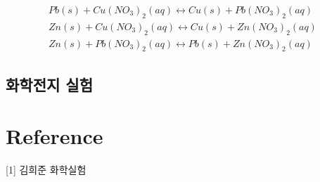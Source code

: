 \documentclass[%
 reprint,
 amsmath,amssymb,
 aps,
]{revtex4-2}
\begin{document}
\begin{align}
Pb(s)+Cu(NO_{3})_{2}(aq)\leftrightarrow Cu(s) + Pb(NO_{3})_{2}(aq)\\
Zn(s)+Cu(NO_{3})_{2}(aq)\leftrightarrow Cu(s) + Zn(NO_{3})_{2}(aq)\\
Zn(s)+Pb(NO_{3})_{2}(aq)\leftrightarrow Pb(s) + Zn(NO_{3})_{2}(aq)
\end{align}

\subsection{\label{sec:level2}화학전지 실험}


\section{\label{sec:level1}Reference}
[1] 김희준 화학실험
\end{document}
